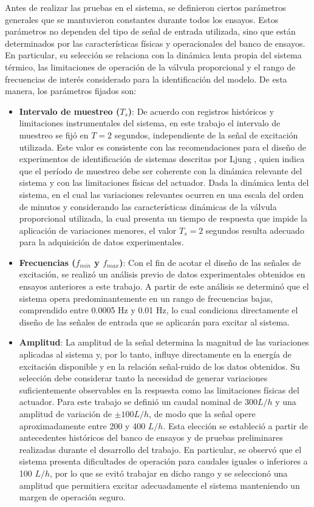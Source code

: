 \documentclass[11pt]{report}
\begin{document}
Antes de realizar las pruebas en el sistema, se definieron ciertos parámetros generales que se mantuvieron constantes durante todos los ensayos. Estos parámetros no dependen del tipo de señal de entrada utilizada, sino que están determinados por las características físicas y operacionales del banco de ensayos. En particular, su selección se relaciona con la dinámica lenta propia del sistema térmico, las limitaciones de operación de la válvula proporcional y el rango de frecuencias de interés considerado para la identificación del modelo. De esta manera, los parámetros fijados son:
\begin{itemize}
    \item \textbf{Intervalo de muestreo ($T_s$)}: De acuerdo con registros históricos y limitaciones instrumentales del sistema, en este trabajo el intervalo de muestreo se fijó en $T=2 $ segundos, independiente de la señal de excitación utilizada. Este valor es consistente con las recomendaciones para el diseño de experimentos de identificación de sistemas descritas por Ljung \cite{ljung1999system}, quien indica que el período de muestreo debe ser coherente con la dinámica relevante del sistema y con las limitaciones físicas del actuador. Dada la dinámica lenta del sistema, en el cual las variaciones relevantes ocurren en una escala del orden de minutos y considerando las características dinámicas de la válvula proporcional utilizada, la cual presenta un tiempo de respuesta que impide la aplicación de variaciones menores, el valor $T_s=2$ segundos resulta adecuado para la adquisición de datos experimentales.
    \item \textbf{Frecuencias ($f_{min}$ y $f_{max}$)}: Con el fin de acotar el diseño de las señales de excitación, se realizó un análisis previo de datos experimentales obtenidos en ensayos anteriores a este trabajo. A partir de este análisis se determinó que el sistema opera predominantemente en un rango de frecuencias bajas, comprendido entre 0.0005 Hz y 0.01 Hz, lo cual condiciona directamente el diseño de las señales de entrada que se aplicarán para excitar al sistema.
    \item \textbf{Amplitud}: La amplitud de la señal determina la magnitud de las variaciones aplicadas al sistema y, por lo tanto, influye directamente en la energía de excitación disponible y en la relación señal-ruido de los datos obtenidos. Su selección debe considerar tanto la necesidad de generar variaciones suficientemente observables en la respuesta como las limitaciones físicas del actuador. Para este trabajo se definió un caudal nominal de $300 L/h$ y una amplitud de variación de $\pm 100 L/h$, de modo que la señal opere aproximadamente entre 200 y 400 $ L/h$. Esta elección se estableció a partir de antecedentes históricos del banco de ensayos y de pruebas preliminares realizadas durante el desarrollo del trabajo. En particular, se observó que el sistema presenta dificultades de operación para caudales iguales o inferiores a 100 $L/h$, por lo que se evitó trabajar en dicho rango y se seleccionó una amplitud que permitiera excitar adecuadamente el sistema manteniendo un margen de operación seguro.
    

\end{itemize}
\end{document}
